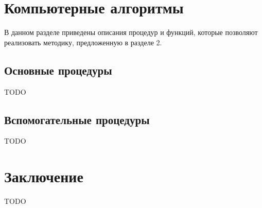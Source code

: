 \documentclass[a4paper,14pt]{extarticle}
\begin{document}
\section{Компьютерные алгоритмы}
В данном разделе приведены описания процедур и функций, которые позволяют реализовать методику, предложенную в разделе 2. 
\subsection{Основные процедуры}
TODO
\subsection{Вспомогательные процедуры}
TODO
\section*{\centering Заключение}
TODO

\printbibliography
\end{document}
